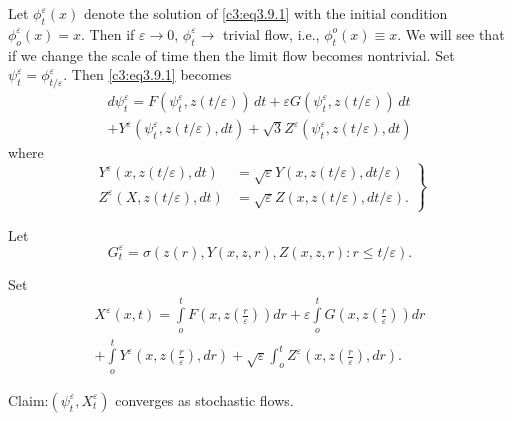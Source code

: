 Let $\phi^\varepsilon_t (x)$ denote the solution of \eqref{c3:eq3.9.1} with the initial
condition $\phi^\varepsilon_o (x)=x$. Then if $\varepsilon \to 0$,
$\phi^\varepsilon_t \to$ 
trivial flow, i.e.,  $\phi^o_t (x)\equiv x$. We will see that if we
change the scale of time then the limit flow becomes nontrivial. Set
$\psi^\varepsilon_t = \phi^\varepsilon_{t/ \varepsilon}$. Then \eqref{c3:eq3.9.1} becomes 
\begin{multline*}
d \psi^\varepsilon_t= F(\psi^\varepsilon_t, z(t/ \varepsilon)) \, dt
+ \varepsilon G (\psi^\varepsilon_t, z(t /\varepsilon))\, dt \\
+ Y^\varepsilon (\psi^\varepsilon_t, z(t/ \varepsilon),dt)+ \sqrt{3}
Z^\varepsilon (\psi^\varepsilon_t, 
z(t/ \varepsilon), dt) \tag{3.9.2}\label{c3:eq3.9.2} 
\end{multline*}
where
\begin{equation*}
  \left.
  \tag{3.9.3}\label{c3:eq3.9.3}
  \begin{aligned}
    Y^ \varepsilon (x,z(t/ \varepsilon), dt) & = \sqrt{\varepsilon}
    Y(x,z(t/ \varepsilon),dt/ \varepsilon) \\  
    Z^\varepsilon(X,z(t/ \varepsilon), dt) & = \sqrt{\varepsilon}
    Z(x,z(t/ \varepsilon), dt / \varepsilon).  
  \end{aligned}
  \right\}
\end{equation*}

Let
$$
G^ \varepsilon_t =\sigma (z(r),Y(x,z,r),Z(x,z,r):r \leq t/
\varepsilon). 
$$
                                        
Set
\begin{multline*}
  X^\varepsilon (x,t)= \int  \limits^t_o
  F\left(x,z\left(\frac{r}{\varepsilon}\right)\right)dr + \varepsilon \int 
  \limits ^t_o G\left(x,z\left(\frac{r}{\varepsilon}\right)\right)dr\\ 
  + \int \limits ^t_o Y^ \varepsilon
  \left(x,z\left(\frac{r}{\varepsilon}\right),dr\right) +\sqrt{\varepsilon} \int 
  ^t_o Z^ \varepsilon \left(x,z\left(\frac{r}{\varepsilon}\right),dr\right). 
\tag{3.9.4}\label{c3:eq3.9.4} 
\end{multline*}

Claim:\pageoriginale $(\psi ^ \varepsilon_t, X^\varepsilon _t)$ converges as stochastic flows.

